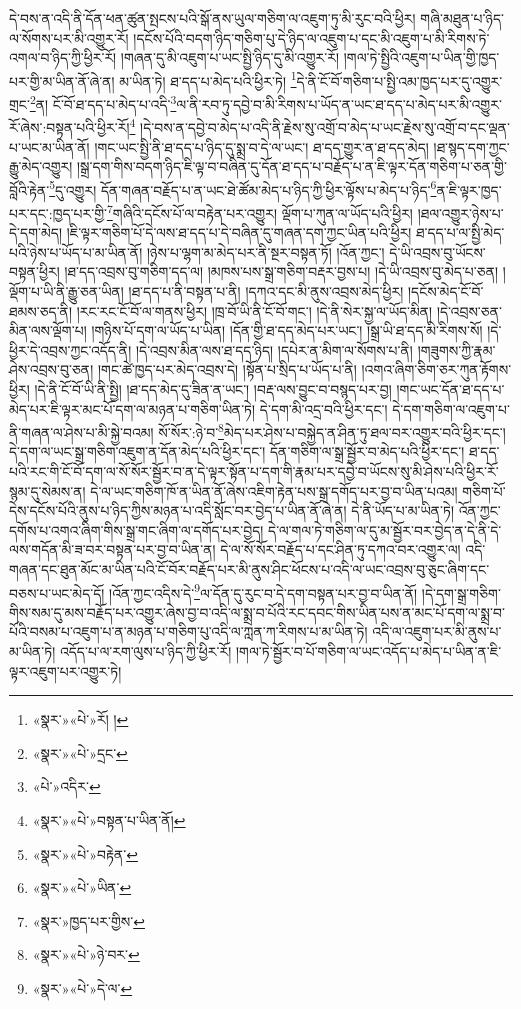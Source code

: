 དེ་བས་ན་འདི་ནི་དོན་ཕན་ཚུན་སྤངས་པའི་སྒོ་ནས་ཡུལ་གཅིག་ལ་འཇུག་ཏུ་མི་རུང་བའི་ཕྱིར། གཞི་མཐུན་པ་ཉིད་ལ་སོགས་པར་མི་འགྱུར་རོ། །དངོས་པོའི་བདག་ཉིད་གཅིག་པུ་དེ་ཉིད་ལ་འཇུག་པ་དང་མི་འཇུག་པ་མི་རིགས་ཏེ་འགལ་བ་ཉིད་ཀྱི་ཕྱིར་རོ། །གཞན་དུ་མི་འཇུག་པ་ཡང་སྤྱི་ཉིད་དུ་མི་འགྱུར་རོ། །གལ་ཏེ་སྤྱིའི་འཇུག་པ་ཡིན་གྱི་ཁྱད་པར་གྱི་མ་ཡིན་ནོ་ཞེ་ན། མ་ཡིན་ཏེ། ཐ་དད་པ་མེད་པའི་ཕྱིར་ཏེ། \footnote{«སྣར་»«པེ་»རོ། ། }དེ་ནི་ངོ་བོ་གཅིག་པ་སྤྱི་འམ་ཁྱད་པར་དུ་འགྱུར་གྲང་\footnote{«སྣར་»«པེ་»དྲང་}ན། ངོ་བོ་ཐ་དད་པ་མེད་པ་འདི་\footnote{«པེ་»འདིར་}ལ་ནི་རབ་ཏུ་དབྱེ་བ་མི་རིགས་པ་ཡོད་ན་ཡང་ཐ་དད་པ་མེད་པར་མི་འགྱུར་རོ་ཞེས་:བསྟན་པའི་ཕྱིར་རོ།\footnote{«སྣར་»«པེ་»བསྟན་པ་ཡིན་ནོ།} །དེ་བས་ན་དབྱེ་བ་མེད་པ་འདི་ནི་རྗེས་སུ་འགྲོ་བ་མེད་པ་ཡང་རྗེས་སུ་འགྲོ་བ་དང་ལྡན་པ་ཡང་མ་ཡིན་ནོ། །གང་ཡང་སྤྱི་ནི་ཐ་དད་པ་ཉིད་དུ་སྨྲ་བ་དེ་ལ་ཡང་། ཐ་དད་གྱུར་ན་ཐ་དད་མེད། །ཐ་སྙད་དག་ཀྱང་རྒྱུ་མེད་འགྱུར། །སྒྲ་དག་གིས་བདག་ཉིད་ཇི་ལྟ་བ་བཞིན་དུ་དོན་ཐ་དད་པ་བརྗོད་པ་ན་ཇི་ལྟར་དོན་གཅིག་པ་ཅན་གྱི་བློའི་རྟེན་\footnote{«སྣར་»«པེ་»བརྟེན་}དུ་འགྱུར། དོན་གཞན་བརྗོད་པ་ན་ཡང་ཐེ་ཚོམ་མེད་པ་ཉིད་ཀྱི་ཕྱིར་ལྟོས་པ་མེད་པ་ཉིད་\footnote{«སྣར་»«པེ་»ཡིན་}ན་ཇི་ལྟར་ཁྱད་པར་དང་:ཁྱད་པར་གྱི་\footnote{«སྣར་»ཁྱད་པར་གྱིས་}གཞིའི་དངོས་པོ་ལ་བརྟེན་པར་འགྱུར། ལྡོག་པ་ཀུན་ལ་ཡོད་པའི་ཕྱིར། །ཐལ་འགྱུར་ཉེས་པ་དེ་དག་མེད། །ཇི་ལྟར་གཅིག་པོ་དེ་ལས་ཐ་དད་པ་དེ་བཞིན་དུ་གཞན་དག་ཀྱང་ཡིན་པའི་ཕྱིར། ཐ་དད་པ་ལ་སྤྱི་མེད་པའི་ཉེས་པ་ཡོད་པ་མ་ཡིན་ནོ། །ཉེས་པ་ལྷག་མ་མེད་པར་ནི་སྔར་བསྟན་ཏོ། །འོན་ཀྱང་། དེ་ཡི་འབྲས་བུ་ཡོངས་བསྟན་ཕྱིར། །ཐ་དད་འབྲས་བུ་གཅིག་དད་ལ། །མཁས་པས་སྒྲ་གཅིག་བརྡར་བྱས་པ། །དེ་ཡི་འབྲས་བུ་མེད་པ་ཅན། །ལྡོག་པ་ཡི་ནི་རྒྱུ་ཅན་ཡིན། །ཐ་དད་པ་ནི་བསྟན་པ་ནི། །དཀའ་དང་མི་ནུས་འབྲས་མེད་ཕྱིར། །དངོས་མེད་ངོ་བོ་ཐམས་ཅད་ནི། །རང་རང་ངོ་བོ་ལ་གནས་ཕྱིར། །ཁྲ་བོ་ཡི་ནི་ངོ་བོ་གང་། །དེ་ནི་སེར་སྐྱ་ལ་ཡོད་མིན། །དེ་འབྲས་ཅན་མིན་ལས་ལྡོག་པ། །གཉིས་པོ་དག་ལ་ཡོད་པ་ཡིན། །དོན་གྱི་ཐ་དད་མེད་པར་ཡང་། །སྒྲ་ཡི་ཐ་དད་མི་རིགས་སོ། །དེ་ཕྱིར་དེ་འབྲས་ཀྱང་འདོད་ནི། །དེ་འབྲས་མིན་ལས་ཐ་དད་ཉིད། །དཔེར་ན་མིག་ལ་སོགས་པ་ནི། །གཟུགས་ཀྱི་རྣམ་ཤེས་འབྲས་བུ་ཅན། །གང་ཚེ་ཁྱད་པར་མེད་འབྲས་དེ། །སྟོན་པ་སྲིད་པ་ཡོད་པ་ནི། །འགའ་ཞིག་ཅིག་ཅར་ཀུན་རྟོགས་ཕྱིར། །དེ་ནི་ངོ་བོ་ཡི་ནི་སྤྱི། །ཐ་དད་མེད་དུ་ཟིན་ན་ཡང་། །བརྡ་ལས་བྱུང་བ་བསྙད་པར་བྱ། །གང་ཡང་དོན་ཐ་དད་པ་མེད་པར་ཇི་ལྟར་མང་པོ་དག་ལ་མཉན་པ་གཅིག་ཡིན་ཏེ། དེ་དག་མི་འདྲ་བའི་ཕྱིར་དང་། དེ་དག་གཅིག་ལ་འཇུག་པ་ནི་གཞན་ལ་ཤེས་པ་མི་སྐྱེ་བའམ། སོ་སོར་:ཉེ་བ་\footnote{«སྣར་»«པེ་»ཉེ་བར་}མེད་པར་ཤེས་པ་བསྐྱེད་ན་ཤིན་ཏུ་ཐལ་བར་འགྱུར་བའི་ཕྱིར་དང་། དེ་དག་ལ་ཡང་སྒྲ་གཅིག་འཇུག་ན་དོན་མེད་པའི་ཕྱིར་དང་། དོན་གཅིག་ལ་སྒྲ་སྦྱོར་བ་མེད་པའི་ཕྱིར་དང་། ཐ་དད་པའི་རང་གི་ངོ་བོ་དག་ལ་སོ་སོར་སྦྱོར་བ་ན་དེ་ལྟར་སྟོན་པ་དག་གི་རྣམ་པར་དབྱེ་བ་ཡོངས་སུ་མི་ཤེས་པའི་ཕྱིར་རོ་སྙམ་དུ་སེམས་ན། དེ་ལ་ཡང་གཅིག་ཁོ་ན་ཡིན་ནོ་ཞེས་འཇིག་རྟེན་པས་སྒྲ་དགོད་པར་བྱ་བ་ཡིན་པའམ། གཅིག་པོ་དེས་དངོས་པོའི་ནུས་པ་ཉིད་ཀྱིས་མཉན་པ་འདི་སློང་བར་བྱེད་པ་ཡིན་ནོ་ཞེ་ན། དེ་ནི་ཡོད་པ་མ་ཡིན་ཏེ། འོན་ཀྱང་དགོས་པ་འགའ་ཞིག་གིས་སྒྲ་གང་ཞིག་ལ་དགོད་པར་བྱེད། དེ་ལ་གལ་ཏེ་གཅིག་ལ་དུ་མ་སྦྱོར་བར་བྱེད་ན་དེ་ནི་དེ་ལས་གདོན་མི་ཟ་བར་བསྟན་པར་བྱ་བ་ཡིན་ན། དེ་ལ་སོ་སོར་བརྗོད་པ་དང་ཤིན་ཏུ་དཀའ་བར་འགྱུར་ལ། འདི་གཞན་དང་ཐུན་མོང་མ་ཡིན་པའི་ངོ་བོར་བརྗོད་པར་མི་ནུས་ཤིང་ཕོངས་པ་འདི་ལ་ཡང་འབྲས་བུ་ཅུང་ཞིག་དང་བཅས་པ་ཡང་མེད་དོ། །འོན་ཀྱང་འདིས་དེ་\footnote{«སྣར་»«པེ་»དེ་ལ་}ལ་དོན་དུ་རུང་བ་དེ་དག་བསྟན་པར་བྱ་བ་ཡིན་ནོ། །དེ་དག་སྒྲ་གཅིག་གིས་སམ་དུ་མས་བརྗོད་པར་འགྱུར་ཞེས་བྱ་བ་འདི་ལ་སྨྲ་བ་པོའི་རང་དབང་གིས་ཡིན་པས་ན་མང་པོ་དག་ལ་སྨྲ་བ་པོའི་བསམ་པ་འཇུག་པ་ན་མཉན་པ་གཅིག་པུ་འདི་ལ་ཀླན་ཀ་རིགས་པ་མ་ཡིན་ཏེ། འདི་ལ་འཇུག་པར་མི་ནུས་པ་མ་ཡིན་ཏེ། འདོད་པ་ལ་རག་ལུས་པ་ཉིད་ཀྱི་ཕྱིར་རོ། །གལ་ཏེ་སྦྱོར་བ་པོ་གཅིག་ལ་ཡང་འདོད་པ་མེད་པ་ཡིན་ན་ཇི་ལྟར་འཇུག་པར་འགྱུར་ཏེ། 